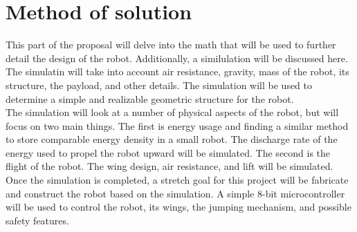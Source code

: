 \section{Method of solution}
\label{method}
\indent This part of the proposal will delve into the math that will be used to further detail the design of the robot. Additionally, a similulation will be discussed here. The simulatin will take into account air resistance, gravity, mass of the robot, its structure, the payload, and other details. The simulation will be used to determine a simple and realizable geometric structure for the robot. \\

\indent The simulation will look at a number of physical aspects of the robot, but will focus on two main things. The first is energy usage and finding a similar method to store comparable energy density in a small robot. The discharge rate of the energy used to propel the robot upward will be simulated. The second is the flight of the robot. The wing design, air resistance, and lift will be simulated.\\

\indent Once the simulation is completed, a stretch goal for this project will be fabricate and construct the robot based on the simulation. A simple 8-bit microcontroller will be used to control the robot, its wings, the jumping mechanism, and possible safety features.\\

